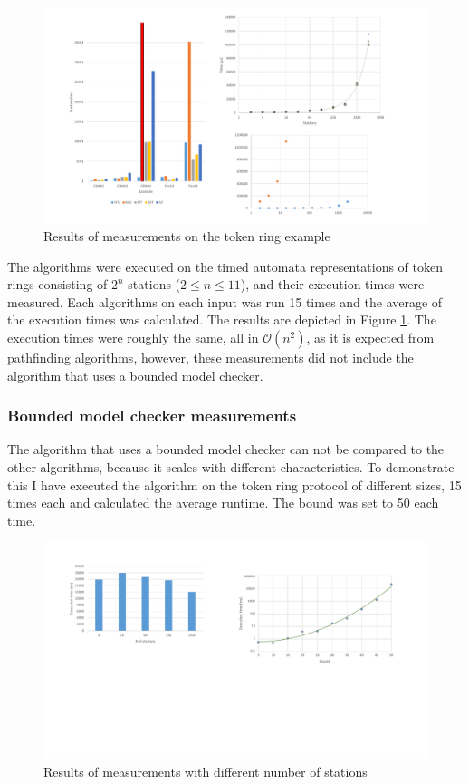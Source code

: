 \begin{figure}
	\centering
	\includegraphics[width=\textwidth]{include/figures/diag_tokenfddi}
	\caption{Results of measurements on the token ring example}
	\label{fig:tokendiag}
\end{figure}

The algorithms were executed on the timed automata representations of token rings consisting of $2^n$ stations ($2 \leq n \leq 11$), and their execution times were measured. Each algorithms on each input was run 15 times and the average of the execution times was calculated. The results are depicted in Figure \ref{fig:tokendiag}. The execution times were roughly the same, all in $\mathcal{O}(n^2)$, as it is expected from pathfinding algorithms, however, these measurements did not include the algorithm that uses a bounded model checker.

\subsubsection{Bounded model checker measurements}

The algorithm that uses a bounded model checker can not be compared to the other algorithms, because it scales with different characteristics. To demonstrate this I have executed the algorithm on the token ring protocol of different sizes, 15 times each and calculated the average runtime. The bound was set to 50 each time.

\begin{figure}
	\centering
	\includegraphics[width=\textwidth]{include/figures/diag_bound_station}
	\caption{Results of measurements with different number of stations}
	\label{fig:tokenboundstations}
\end{figure}

